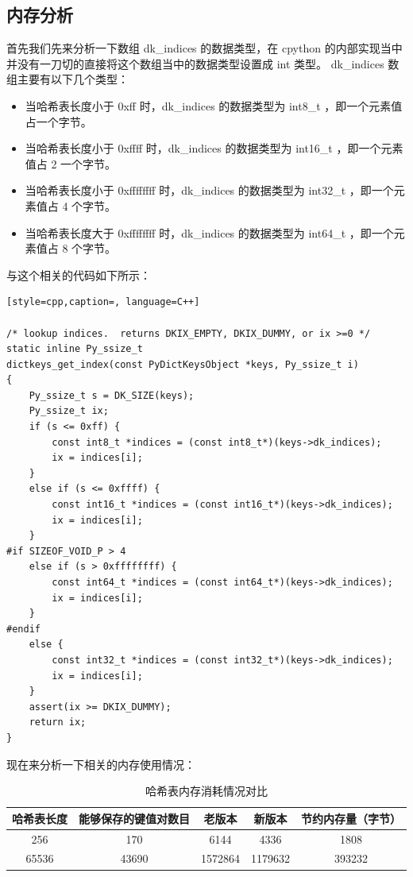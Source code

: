 \subsection{内存分析}
首先我们先来分析一下数组 dk\_indices 的数据类型，在 cpython 的内部实现当中并没有一刀切的直接将这个数组当中的数据类型设置成 int 类型。
dk\_indices 数组主要有以下几个类型：
\begin{itemize}
\item 当哈希表长度小于 0xff 时，dk\_indices 的数据类型为 int8\_t ，即一个元素值占一个字节。 
\item 当哈希表长度小于 0xffff 时，dk\_indices 的数据类型为 int16\_t ，即一个元素值占 2 一个字节。 
\item 当哈希表长度小于 0xffffffff 时，dk\_indices 的数据类型为 int32\_t ，即一个元素值占 4 个字节。 
\item 当哈希表长度大于 0xffffffff 时，dk\_indices 的数据类型为 int64\_t ，即一个元素值占 8 个字节。 
\end{itemize}
与这个相关的代码如下所示：
\begin{lstlisting}[style=cpp,caption=, language=C++]

/* lookup indices.  returns DKIX_EMPTY, DKIX_DUMMY, or ix >=0 */
static inline Py_ssize_t
dictkeys_get_index(const PyDictKeysObject *keys, Py_ssize_t i)
{
    Py_ssize_t s = DK_SIZE(keys);
    Py_ssize_t ix;
    if (s <= 0xff) {
        const int8_t *indices = (const int8_t*)(keys->dk_indices);
        ix = indices[i];
    }
    else if (s <= 0xffff) {
        const int16_t *indices = (const int16_t*)(keys->dk_indices);
        ix = indices[i];
    }
#if SIZEOF_VOID_P > 4
    else if (s > 0xffffffff) {
        const int64_t *indices = (const int64_t*)(keys->dk_indices);
        ix = indices[i];
    }
#endif
    else {
        const int32_t *indices = (const int32_t*)(keys->dk_indices);
        ix = indices[i];
    }
    assert(ix >= DKIX_DUMMY);
    return ix;
}
\end{lstlisting}
现在来分析一下相关的内存使用情况：
\begin{table}[]
    \centering
        \begin{tabular}{|c|c|c|c|c|}
        \hline
        \textbf{哈希表长度} & \textbf{能够保存的键值对数目} & \textbf{老版本} & \textbf{新版本} & \textbf{节约内存量（字节）}  \\
        \hline
        256 & 170 & 6144 & 4336 & 1808 \\
        \hline
        65536 & 43690 & 1572864 & 1179632 & 393232 \\
        \hline
        \end{tabular}
    \caption{哈希表内存消耗情况对比}
    \label{tab:my_label}
\end{table}

